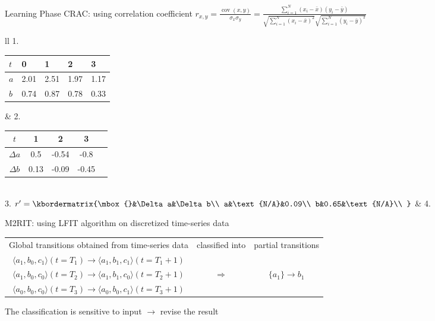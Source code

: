 \documentclass[8pt]{beamer}
\begin{document}
\begin{frame}{Learning Phase}
CRAC: using correlation coefficient $r_{x,y}={\frac {\operatorname {cov} (x,y)}{\sigma _{x}\sigma _{y}}}$\pause$={\frac {\sum _{i=1}^{N}(x_{i}-{\bar {x}})(y_{i}-{\bar {y}})}{{\sqrt {\sum _{i=1}^{N}(x_{i}-{\bar {x}})^{2}}}{\sqrt {\sum _{i=1}^{N}(y_{i}-{\bar {y}})^{2}}}}}$

\pause
\vspace{0.2cm}
\begin{tabular}{ll}
1.\begin{tabular}{l|*{4}{l}}
$t$&0&1&2&3\\
\hline
$a$&2.01&2.51&1.97&1.17\\
$b$&0.74&0.87&0.78&0.33\\
\end{tabular}   
\pause
& 
2.
\begin{tabular}{c|c*{3}{S}}
$t$&1&2&3\\
\hline
$\Delta a$&0.5&-0.54&-0.8\\
$\Delta b$&0.13&-0.09&-0.45\\
\end{tabular}
\pause
\\
3.
$r'=\kbordermatrix{\mbox{}&\Delta a&\Delta b\\
a&\text{N/A}&0.09\\
b&0.65&\text{N/A}\\
}$ 
\pause
&
4.
\end{tabular}

\vspace{1.2cm}
\pause

M2RIT: using LFIT algorithm on discretized time-series data

\vspace{0.2cm}
\begin{tabular}{ccc}
    Global transitions obtained from time-series data & classified into & partial transitions\\
    $\langle a_1,b_0,c_1\rangle(t=T_1)\to \langle a_1,b_1,c_1\rangle(t=T_1+1)$&&\\
    $\langle a_1,b_0,c_0\rangle(t=T_2)\to \langle a_1,b_1,c_0\rangle(t=T_2+1)$&$\Longrightarrow$&$\{a_1\}\to b_1$\\
    $\langle a_0,b_0,c_0\rangle(t=T_3)\to \langle a_0,b_0,c_1\rangle(t=T_3+1)$&&
\end{tabular}

\vspace{0.2cm}
\pause
The classification is sensitive to input $\to$ revise the result
\end{frame}
\end{document}
